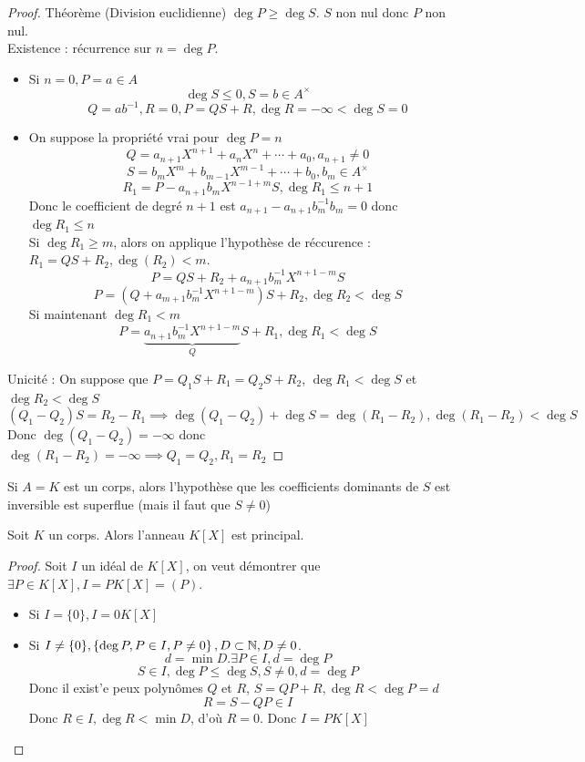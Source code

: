 \documentclass[]{report}
\begin{document}
    \begin{proof}{Théorème (Division euclidienne)}{}
        $\deg P\ge \deg S$. $S$ non nul donc $P$ non nul.\\
        Existence : récurrence sur $n=\deg P$.
        \begin{itemize}
            \item Si $n=0,P=a\in A$
            \[\deg S \le 0, S=b\in A^{\times}\]
            \[Q=ab^{-1}, R=0,P=QS+R,\deg R=-\infty<\deg S=0 \]
            \item On suppose la propriété vrai pour $\deg P=n$
            \[Q=a_{n+1}X^{n+1}+a_n X^n+\cdots +a_0,a_{n+1}\neq 0\]
            \[S=b_m X^m+b_{m-1}X^{m-1}+\cdots+b_0,b_m\in A^{\times}\]
            \[R_1=P-a_{n+1}b_mX^{n-1+m}S,\deg R_1\le n+1\]
            Donc le coefficient de degré $n+1$ est $a_{n+1}-a_{n+1}b_m^{-1}b_m=0$ donc $\deg R_1\le n$\\
            Si $\deg R_1\ge m$, alors on applique l'hypothèse de réccurence : $R_1=QS+R_2,\deg (R_2)<m$.
            \[P=QS+R_2+a_{n+1} b_m^{-1} X^{n+1-m}S\]
            \[P=(Q+a_{m+1}b_m^{-1}X^{n+1-m})S+R_2,\deg R_2<\deg S\]
            Si maintenant $\deg R_1<m$
            \[P=\underset{Q}{\underbrace{a_{n+1}b_m^{-1}X^{n+1-m}}}S+ R_1, \deg R_1< \deg S\]
        \end{itemize}
        Unicité : On suppose que $P=Q_1 S+ R_1=Q_2 S +R_2$, $\deg R_1<\deg S$ et $\deg R_2<\deg S$
        \[(Q_1-Q_2)S=R_2-R_1\implies \deg (Q_1-Q_2)+\deg S=\deg (R_1-R_2), \deg (R_1-R_2)<\deg S\]
        Donc $\deg(Q_1-Q_2)=-\infty$ donc $\deg (R_1-R_2)=-\infty\implies Q_1=Q_2,R_1=R_2$
    \end{proof}

    \begin{re}{}{}
        Si $A=K$ est un corps, alors l'hypothèse que les coefficients dominants de $S$ est inversible est superflue (mais il faut que $S\neq 0$)
    \end{re}

    \begin{prop}{}{}
        Soit $K$ un corps. Alors l'anneau $K[X]$ est principal.
    \end{prop}

    \begin{proof}
        Soit $I$ un idéal de $K[X]$, on veut démontrer que $\exists P\in K[X],I=PK[X]=(P)$.
        \begin{itemize}
            \item Si $I=\{0\},I=0 K[X]$
            \item Si $I\neq \{0\},\left\{\deg P,P\in I,P\neq 0 \right\},D\subset \mathbb{N},D\neq 0$.\\
            \[ d=\min D.\exists P\in I,d=\deg P\]
            \[S\in I,\deg P\le \deg S,S\neq 0,d=\deg P\]
            Donc il exist'e peux polynômes $Q$ et $R$, $S=QP+R,\deg R< \deg P=d$
            \[R=S-QP\in I\]
            Donc $R\in I,\deg R<\min D$, d'où $R=0$. Donc $I=PK[X]$
        \end{itemize}
    \end{proof}
\end{document}
